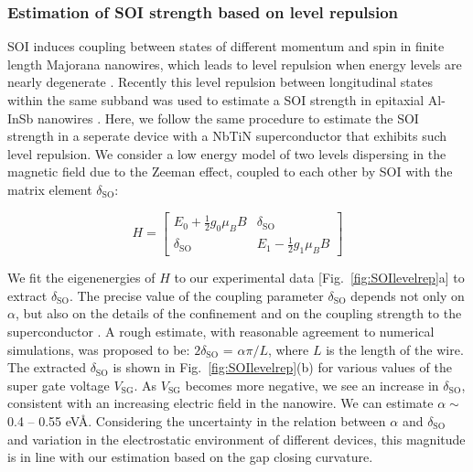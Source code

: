 \subsubsection{Estimation of SOI strength based on level repulsion}
SOI induces coupling between states of different momentum and spin in finite length Majorana nanowires, which leads to level repulsion when energy levels are nearly degenerate \cite{Stanescu2013}.
Recently this level repulsion between longitudinal states within the same subband was used to estimate a SOI strength in epitaxial Al-InSb nanowires \cite{Moor2018}.
Here, we follow the same procedure to estimate the SOI strength in a seperate device with a NbTiN superconductor that exhibits such level repulsion.
We consider a low energy model of two levels dispersing in the magnetic field due to the Zeeman effect, coupled to each other by SOI with the matrix element $\delta_{\mathrm{SO}}$:

\begin{equation}
H = \begin{bmatrix}
E_0 + \frac{1}{2}g_0 \mu_B B & \delta_{\mathrm{SO}} \\
\delta_{\mathrm{SO}} & E_1 - \frac{1}{2}g_1 \mu_B B
\end{bmatrix}
\end{equation}

We fit the eigenenergies of $H$ to our experimental data [Fig.~\ref{fig:SOIlevelrep}a] to extract $\delta_{\mathrm{SO}}$.
The precise value of the coupling parameter $\delta_{\mathrm{SO}}$ depends not only on $\alpha$, but also on the details of the confinement and on the coupling strength to the superconductor \cite{Moor2018}.
A rough estimate, with reasonable agreement to numerical simulations, was proposed to be: $2\delta_{\mathrm{SO}}$ = $\alpha \pi/ L$, where $L$ is the length of the wire.
The extracted $\delta_{\mathrm{SO}}$ is shown in Fig.~\ref{fig:SOIlevelrep}(b) for various values of the super gate voltage $V_{\mathrm{SG}}$.
As $V_{\mathrm{SG}}$ becomes more negative, we see an increase in $\delta_{\mathrm{SO}}$, consistent with an increasing electric field in the nanowire.
We can estimate $\alpha \sim$ 0.4 -- 0.55 eV\AA.
Considering the uncertainty in the relation between $\alpha$ and $\delta_{\mathrm{SO}}$ and variation in the electrostatic environment of different devices, this magnitude is in line with our estimation based on the gap closing curvature.

